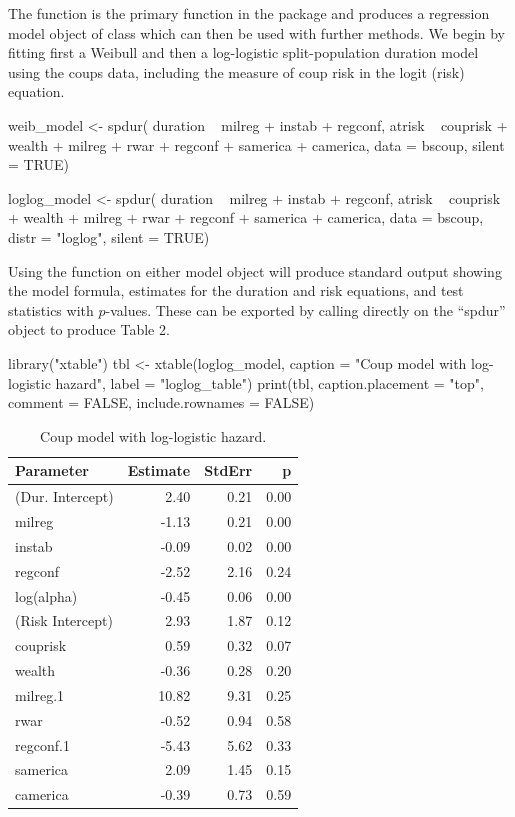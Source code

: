 \documentclass[article]{jss}
\begin{document}
The  function is the primary function in the package and
produces a regression model object of class  which can then
be used with further methods. We begin by fitting first a Weibull and
then a log-logistic split-population duration model using the coups
data, including the measure of coup risk in the logit (risk) equation.

\begin{CodeChunk}
\begin{CodeInput}
weib_model <- spdur(
  duration ~ milreg + instab + regconf,
  atrisk ~ couprisk + wealth + milreg + rwar + regconf + samerica + camerica,
  data = bscoup, silent = TRUE)

loglog_model <- spdur(
  duration ~ milreg + instab + regconf,
  atrisk ~ couprisk + wealth + milreg + rwar + regconf + samerica + camerica,
  data = bscoup, distr = "loglog", silent = TRUE)
\end{CodeInput}
\end{CodeChunk}

Using the  function on either model object will produce
standard output showing the model formula, estimates for the duration
and risk equations, and test statistics with \(p\)-values. These can be
exported by calling  directly on the ``spdur'' object to
produce Table 2.

\begin{CodeChunk}
\begin{CodeInput}
library("xtable")
tbl <- xtable(loglog_model, caption = "Coup model with log-logistic hazard",
              label = "loglog_table")
print(tbl, caption.placement = "top", comment = FALSE, include.rownames = FALSE)
\end{CodeInput}
\end{CodeChunk}

\begin{table}[ht]
\centering
\begin{tabular}{lrrr}
  \hline
Parameter & Estimate & StdErr & p \\ 
  \hline
(Dur. Intercept) & 2.40 & 0.21 & 0.00 \\ 
  milreg & -1.13 & 0.21 & 0.00 \\ 
  instab & -0.09 & 0.02 & 0.00 \\ 
  regconf & -2.52 & 2.16 & 0.24 \\ 
  log(alpha) & -0.45 & 0.06 & 0.00 \\ 
  (Risk Intercept) & 2.93 & 1.87 & 0.12 \\ 
  couprisk & 0.59 & 0.32 & 0.07 \\ 
  wealth & -0.36 & 0.28 & 0.20 \\ 
  milreg.1 & 10.82 & 9.31 & 0.25 \\ 
  rwar & -0.52 & 0.94 & 0.58 \\ 
  regconf.1 & -5.43 & 5.62 & 0.33 \\ 
  samerica & 2.09 & 1.45 & 0.15 \\ 
  camerica & -0.39 & 0.73 & 0.59 \\ 
   \hline
\end{tabular}
\caption{Coup model with log-logistic hazard.} \label{loglog_table}
\end{table}
\end{document}
